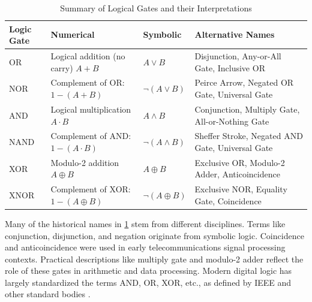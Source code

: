 \begin{table}[htbp]
\centering
\renewcommand{\arraystretch}{1.5} %
\setlength{\tabcolsep}{5pt} %
\begin{tabular}{|>{\centering\arraybackslash}p{2cm}|>{\centering\arraybackslash}p{3cm}|>{\centering\arraybackslash}p{2cm}|>{\centering\arraybackslash}p{5cm}|}
\hline
\textbf{Logic Gate} & \textbf{Numerical} & \textbf{Symbolic} & \textbf{Alternative Names} \\ \hline

OR  & Logical addition (no carry) \( A + B \) & \( A \lor B \) & Disjunction, Any-or-All Gate, Inclusive OR \\ \hline

NOR  & Complement of OR: \( 1 - (A + B) \) & \( \neg (A \lor B) \) & Peirce Arrow, Negated OR Gate, Universal Gate \\ \hline

AND & Logical multiplication \( A \cdot B \) & \( A \land B \) & Conjunction, Multiply Gate, All-or-Nothing Gate \\ \hline

NAND  & Complement of AND: \( 1 - (A \cdot B) \) & \( \neg (A \land B) \) & Sheffer Stroke, Negated AND Gate, Universal Gate \\ \hline

XOR  & Modulo-2 addition \( A \oplus B \) & \( A \oplus B \) & Exclusive OR, Modulo-2 Adder, Anticoincidence \\ \hline

XNOR  & Complement of XOR: \( 1 - (A \oplus B) \) & \( \neg (A \oplus B) \) & Exclusive NOR, Equality Gate, Coincidence \\ \hline

\end{tabular}
\caption{Summary of Logical Gates and their Interpretations}
\label{tab:logic_gates_summary}
\end{table}

Many of the historical names in \ref{tab:logic_gates_summary} stem from different disciplines. Terms like conjunction, disjunction, and negation originate from symbolic logic. Coincidence and anticoincidence were used in early telecommunications signal processing contexts. Practical descriptions like multiply gate and modulo-2 adder reflect the role of these gates in arithmetic and data processing. Modern digital logic has largely standardized the terms AND, OR, XOR, etc., as defined by IEEE and other standard bodies \cite{ieee_std_91}.


